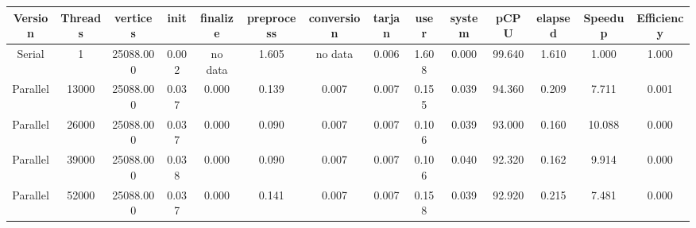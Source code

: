 \begin{tabular}{|c|c|c|c|c|c|c|c|c|c|c|c|c|c|}
\toprule
 Version &  Threads &  vertices &  init & finalize &  preprocess & conversion &  tarjan &  user &  system &   pCPU &  elapsed &  Speedup &  Efficiency \\
\midrule
  Serial &        1 & 25088.000 & 0.002 &  no data &       1.605 &    no data &   0.006 & 1.608 &   0.000 & 99.640 &    1.610 &    1.000 &       1.000 \\
Parallel &    13000 & 25088.000 & 0.037 &    0.000 &       0.139 &      0.007 &   0.007 & 0.155 &   0.039 & 94.360 &    0.209 &    7.711 &       0.001 \\
Parallel &    26000 & 25088.000 & 0.037 &    0.000 &       0.090 &      0.007 &   0.007 & 0.106 &   0.039 & 93.000 &    0.160 &   10.088 &       0.000 \\
Parallel &    39000 & 25088.000 & 0.038 &    0.000 &       0.090 &      0.007 &   0.007 & 0.106 &   0.040 & 92.320 &    0.162 &    9.914 &       0.000 \\
Parallel &    52000 & 25088.000 & 0.037 &    0.000 &       0.141 &      0.007 &   0.007 & 0.158 &   0.039 & 92.920 &    0.215 &    7.481 &       0.000 \\
\bottomrule
\end{tabular}
